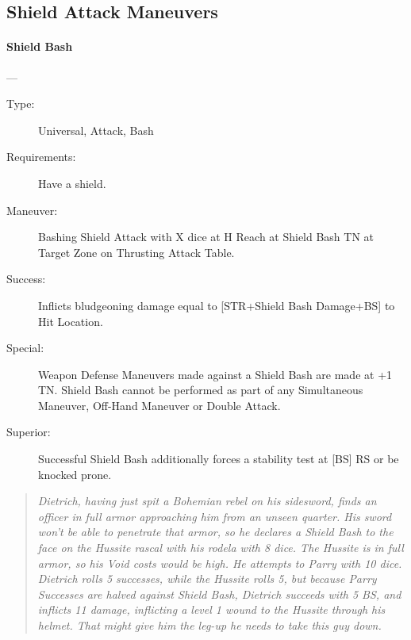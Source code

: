 \documentclass[oneside,11pt,english]{book}
\begin{document}
\subsection{Shield Attack Maneuvers}
\paragraph{\large\label{man:Shield Bash}Shield Bash}---\quad{\large[X]}
\vspace{-10pt}\begin{description} 
\item [Type:] Universal, Attack, Bash 
\item [Requirements:] Have a shield. 
\item [Maneuver:] Bashing Shield Attack with X dice at H Reach at Shield Bash TN at Target Zone on 
Thrusting Attack Table. 
\item [Success:] Inflicts bludgeoning damage equal to [STR+Shield Bash Damage+BS] to Hit Location. 
\item [Special:] Weapon Defense Maneuvers made against a Shield Bash are made at +1 TN. Shield Bash cannot 
be performed as part of any Simultaneous Maneuver, Off-Hand Maneuver or Double Attack. 
\item [Superior:] Successful Shield Bash additionally forces a stability test at [BS] RS or be knocked prone. 
\end{description}
\begin{quotation}
\emph{Dietrich, having just spit a Bohemian rebel on his sidesword, finds an officer in full armor approaching him from an unseen 
quarter. His sword won’t be able to penetrate that armor, so he declares a Shield Bash to the face on the Hussite rascal with his 
rodela with 8 dice. The Hussite is in full armor, so his Void costs would be high. He attempts to Parry with 10 dice. Dietrich 
rolls 5 successes, while the Hussite rolls 5, but because Parry Successes are halved against Shield Bash, Dietrich succeeds with 5 
BS, and inflicts 11 damage, inflicting a level 1 wound to the Hussite through his helmet. That might give him the leg-up he needs 
to take this guy down.}
\end{quotation}
\end{document}
